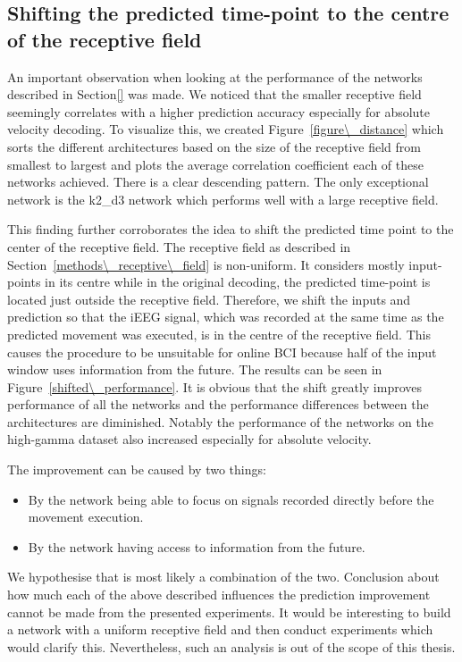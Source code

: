 \subsection{Shifting the predicted time-point to the centre of the receptive field}\label{subsec:shifting-the-predicted-time-point-to-the-centre-of-the-receptive-field}
An important observation when looking at the performance of the networks described in Section\ref{} was made.
We noticed that the smaller receptive field seemingly correlates with a higher prediction accuracy especially for absolute velocity decoding.
To visualize this, we created Figure~\ref{figure\_distance} which sorts the different architectures based on the size of the receptive field from smallest to largest and plots the average correlation coefficient each of these networks achieved.
There is a clear descending pattern.
The only exceptional network is the k2\_d3 network which performs well with a large receptive field.

This finding further corroborates the idea to shift the predicted time point to the center of the receptive field.
The receptive field as described in Section~\ref{methods\_receptive\_field} is non-uniform.
It considers mostly input-points in its centre while in the original decoding, the predicted time-point is located just outside the receptive field.
Therefore, we shift the inputs and prediction so that the iEEG signal, which was recorded at the same time as the predicted movement was executed, is in the centre of the receptive field. This causes the procedure to be unsuitable for online BCI because half of the input window uses information from the future.
The results can be seen in Figure~\ref{shifted\_performance}.
It is obvious that the shift greatly improves performance of all the networks and the performance differences between the architectures are diminished.
Notably the performance of the networks on the high-gamma dataset also increased especially for absolute velocity.

The improvement can be caused by two things:
\begin{itemize}
    \item By the network being able to focus on signals recorded directly before the movement execution.
    \item By the network having access to information from the future.
\end{itemize}

We hypothesise that is most likely a combination of the two.
Conclusion about how much each of the above described influences the prediction improvement cannot be made from the presented experiments.
It would be interesting to build a network with a uniform receptive field and then conduct experiments which would clarify this.
Nevertheless, such an analysis is out of the scope of this thesis.

